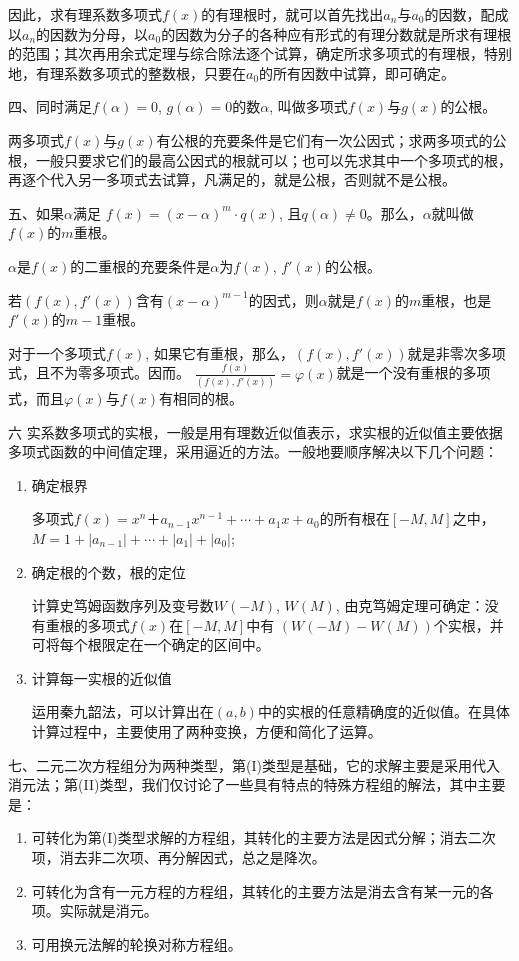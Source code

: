 因此，求有理系数多项式$f(x)$的有理根时，就可以首先找出$a_n$与$a_0$的因数，配成以$a_n$的因数为分母，以$a_0$的因数为分子的各种应有形式的有理分数就是所求有理根的范围；其次再用余式定理与综合除法逐个试算，确定所求多项式的有理根，特别地，有理系数多项式的整数根，只要在$a_0$的所有因数中试算，即可确定。

四、同时满足$f(\alpha)=0$, $g(\alpha)=0$的数$\alpha$, 叫做多项式$f(x)$与$g(x)$的公根。

两多项式$f(x)$与$g(x)$有公根的充要条件是它们有一次公因式；求两多项式的公根，一般只要求它们的最高公因式的根就可以；也可以先求其中一个多项式的根，再逐个代入另一多项式去试算，凡满足的，就是公根，否则就不是公根。

五、如果$\alpha$满足
$f(x)=(x-\alpha)^m\cdot q(x)$, 且$q(\alpha)\ne 0$。那么，$\alpha$就叫做$f(x)$的$m$重根。

$\alpha$是$f(x)$的二重根的充要条件是$\alpha$为$f(x)$, $f'(x)$的公根。

若$(f(x),f'(x))$含有$(x-\alpha)^{m-1}$的因式，则$\alpha$就是$f(x)$的$m$重根，也是$f'(x)$的$m-1$重根。

对于一个多项式$f(x)$, 如果它有重根，那么，$(f(x),f'(x))$就是非零次多项式，且不为零多项式。因而。
$\frac{f (x)}{(f (x) ,f' (x) )}=\varphi(x)$就是一个没有重根的多项式，而且$\varphi(x)$与$f(x)$有相同的根。

六 实系数多项式的实根，一般是用有理数近似值表示，求实根的近似值主要依据多项式函数的中间值定理，采用逼近的方法。一般地要顺序解决以下几个问题：
\begin{enumerate}
    \item 确定根界
    
    多项式$f(x)=x^n＋a_{n-1}x^{n-1}+\cdots+a_1x+a_0$的所有根在$[-M,M]$之中，$M=1+|a_{n-1}|+\cdots+|a_1|+|a_0|$;
    
    \item 确定根的个数，根的定位
    
    计算史笃姆函数序列及变号数$W(-M)$, $W(M)$, 由克笃姆定理可确定：没有重根的多项式$f(x)$在$[-M,M]$中有
    $(W(-M)-W(M))$个实根，并可将每个根限定在一个确定的区间中。
    \item 计算每一实根的近似值
    
    运用秦九韶法，可以计算出在$(a,b)$中的实根的任意精确度的近似值。在具体计算过程中，主要使用了两种变换，方便和简化了运算。
 \end{enumerate}

    七、二元二次方程组分为两种类型，第(I)类型是基础，它的求解主要是采用代入消元法；第(II)类型，我们仅讨论了一些具有特点的特殊方程组的解法，其中主要是：
    \begin{enumerate}
        \item 可转化为第(I)类型求解的方程组，其转化的主要方法是因式分解；消去二次项，消去非二次项、再分解因式，总之是降次。
        \item 可转化为含有一元方程的方程组，其转化的主要方法是消去含有某一元的各项。实际就是消元。
        \item 可用换元法解的轮换对称方程组。
\end{enumerate}

